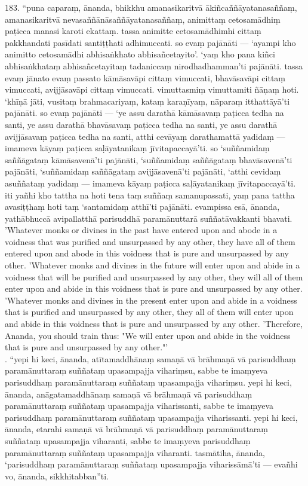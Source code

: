 \documentclass[11pt]{article}
\begin{document}
\begin{paracol}{2}
\begin{column}
183. “puna caparaṃ, ānanda, bhikkhu amanasikaritvā ākiñcaññāyatanasaññaṃ, amanasikaritvā nevasaññānāsaññāyatanasaññaṃ, animittaṃ cetosamādhiṃ paṭicca manasi karoti ekattaṃ. tassa animitte cetosamādhimhi cittaṃ pakkhandati pasīdati santiṭṭhati adhimuccati. so evaṃ pajānāti — ‘ayampi kho animitto cetosamādhi abhisaṅkhato abhisañcetayito’. ‘yaṃ kho pana kiñci abhisaṅkhataṃ abhisañcetayitaṃ tadaniccaṃ nirodhadhamman’ti pajānāti. tassa evaṃ jānato evaṃ passato kāmāsavāpi cittaṃ vimuccati, bhavāsavāpi cittaṃ vimuccati, avijjāsavāpi cittaṃ vimuccati. vimuttasmiṃ vimuttamiti ñāṇaṃ hoti. ‘khīṇā jāti, vusitaṃ brahmacariyaṃ, kataṃ karaṇīyaṃ, nāparaṃ itthattāyā’ti pajānāti. so evaṃ pajānāti — ‘ye assu darathā kāmāsavaṃ paṭicca tedha na santi, ye assu darathā bhavāsavaṃ paṭicca tedha na santi, ye assu darathā avijjāsavaṃ paṭicca tedha na santi, atthi cevāyaṃ darathamattā yadidaṃ — imameva kāyaṃ paṭicca saḷāyatanikaṃ jīvitapaccayā’ti. so ‘suññamidaṃ saññāgataṃ kāmāsavenā’ti pajānāti, ‘suññamidaṃ saññāgataṃ bhavāsavenā’ti pajānāti, ‘suññamidaṃ saññāgataṃ avijjāsavenā’ti pajānāti, ‘atthi cevidaṃ asuññataṃ yadidaṃ — imameva kāyaṃ paṭicca saḷāyatanikaṃ jīvitapaccayā’ti. iti yañhi kho tattha na hoti tena taṃ suññaṃ samanupassati, yaṃ pana tattha avasiṭṭhaṃ hoti taṃ ‘santamidaṃ atthī’ti pajānāti. evampissa esā, ānanda, yathābhuccā avipallatthā parisuddhā paramānuttarā suññatāvakkanti bhavati.\\
\switchcolumn*
 'Whatever monks or divines in the past have entered upon and abode in a voidness that was purified and unsurpassed by any other, they have all of them entered upon and abode in this voidness that is pure and unsurpassed by any other.
'Whatever monks and divines in the future will enter upon and abide in a voidness that will be purified and unsurpassed by any other, they will all of them enter upon and abide in this voidness that is pure and unsurpassed by any other.
'Whatever monks and divines in the present enter upon and abide in a voidness that is purified and unsurpassed by any other, they all of them will enter upon and abide in this voidness that is pure and unsurpassed by any other.
'Therefore, Ananda, you should train thus: "We will enter upon and abide in the voidness that is pure and unsurpassed by any other."'\\
. “yepi hi keci, ānanda, atītamaddhānaṃ samaṇā vā brāhmaṇā vā parisuddhaṃ paramānuttaraṃ suññataṃ upasampajja vihariṃsu, sabbe te imaṃyeva parisuddhaṃ paramānuttaraṃ suññataṃ upasampajja vihariṃsu. yepi hi keci, ānanda, anāgatamaddhānaṃ samaṇā vā brāhmaṇā vā parisuddhaṃ paramānuttaraṃ suññataṃ upasampajja viharissanti, sabbe te imaṃyeva parisuddhaṃ paramānuttaraṃ suññataṃ upasampajja viharissanti. yepi hi keci, ānanda, etarahi samaṇā vā brāhmaṇā vā parisuddhaṃ paramānuttaraṃ suññataṃ upasampajja viharanti, sabbe te imaṃyeva parisuddhaṃ paramānuttaraṃ suññataṃ upasampajja viharanti. tasmātiha, ānanda, ‘parisuddhaṃ paramānuttaraṃ suññataṃ upasampajja viharissāmā’ti — evañhi vo, ānanda, sikkhitabban”ti.\\

\end{column}
\end{paracol}
\end{document}
